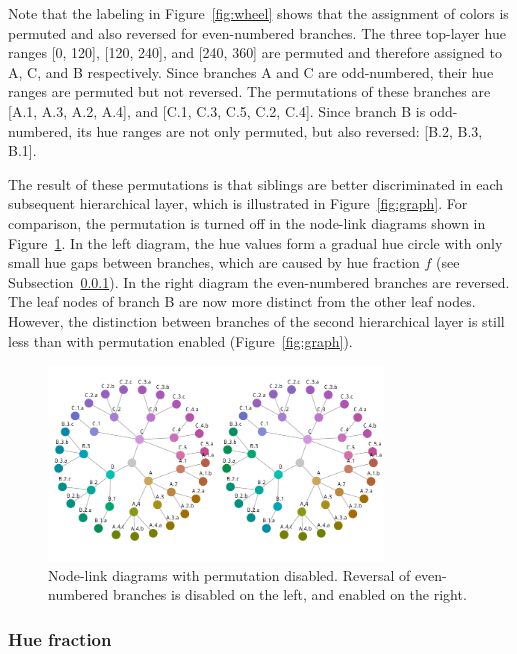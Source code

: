 \documentclass[journal]{vgtc}                %
\begin{document}
Note that the labeling in Figure~\ref{fig:wheel} shows that the assignment of colors is permuted and also reversed for even-numbered branches. The three top-layer hue ranges [0, 120], [120, 240], and [240, 360] are permuted and therefore assigned to A, C, and B respectively. Since branches A and C are odd-numbered, their hue ranges are permuted but not reversed. The permutations of these branches are [A.1, A.3, A.2, A.4], and [C.1, C.3, C.5, C.2, C.4]. Since branch B is odd-numbered, its hue ranges are not only permuted, but also reversed: [B.2, B.3, B.1].

The result of these permutations is that siblings are better discriminated in each subsequent 
hierarchical layer, which is illustrated in Figure~\ref{fig:graph}. For comparison, the permutation 
is turned off in the node-link diagrams shown in Figure~\ref{fig:graph_noperm}. In the left diagram, the hue values 
form a gradual hue circle with only small hue gaps between branches, which are caused by hue fraction $f$ (see Subsection~\ref{secf}). In the right diagram the even-numbered branches are reversed. The leaf nodes of branch B are now more distinct from the other leaf nodes. However, the distinction between branches of the second hierarchical layer is still less than with permutation enabled (Figure~\ref{fig:graph}).

\begin{figure}[!b]

  \centering
  \includegraphics[width=3.5in]{HCPgraph2.pdf}
  \caption{Node-link diagrams with permutation disabled. Reversal of even-numbered branches is disabled on the left, and enabled on the right.}\label{fig:graph_noperm}

\end{figure}


\subsubsection{Hue fraction}\label{secf}
\end{document}
